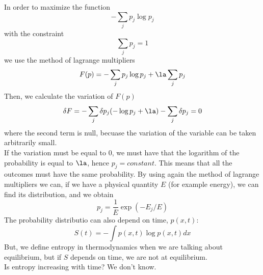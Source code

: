 In order to maximize the function
$$
	-\sum_j p_j \log p_j
$$
with the constraint
$$
	\sum_j p_j = 1
$$
we use the method of lagrange multipliers
$$
	F(p) = -\sum_j p_j\log p_j + \la \sum_j p_j
$$
Then, we calculate the variation of $F(p)$
$$
	\delta F = -\sum_j \delta p_j (-\log p_j + \la) - \sum_j \delta p_j = 0
$$
where the second term is null, becuase the variation of the variable can be taken arbitrarily small. \\
If the variation must be equal to 0, we must have that the logarithm of the probability is equal to $\la$, hence $p_j = constant$. This means that all the outcomes must have the same probability. 
By using again the method of lagrange multipliers we can, if we have a physical quantity $E$ (for example energy), we can find its distribution, and we obtain
$$
	p_j = \frac{1}{\overline{E}} \exp(-E_j/E)
$$
The probability distributio can also depend on time, $p(x,t)$:
$$
	S(t) = -\int p(x,t)\log p(x,t)dx
$$
But, we define entropy in thermodynamics when we are talking about equilibrium, but if $S$ depends on time, we are not at equilibrium. \\
Is entropy increasing with time? We don't know.





